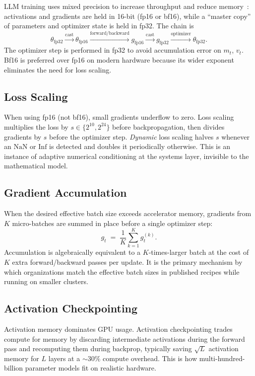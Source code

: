 LLM training uses mixed precision to increase throughput and reduce
memory~\citep{micikevicius2018mixed}: activations and gradients are held
in 16-bit (fp16 or bf16), while a ``master copy'' of parameters and
optimizer state is held in fp32. The chain is
\[
\theta_{\mathrm{fp32}} \xrightarrow{\text{cast}} \theta_{\mathrm{fp16}}
\xrightarrow{\text{forward/backward}} g_{\mathrm{fp16}}
\xrightarrow{\text{cast}} g_{\mathrm{fp32}}
\xrightarrow{\text{optimizer}} \theta_{\mathrm{fp32}}.
\]
The optimizer step is performed in fp32 to avoid accumulation error on
$m_t$, $v_t$. Bf16 is preferred over fp16 on modern hardware because its
wider exponent eliminates the need for loss scaling.

\subsection{Loss Scaling}

When using fp16 (not bf16), small gradients underflow to zero. Loss
scaling multiplies the loss by $s \in \{2^{10}, 2^{24}\}$ before
backpropagation, then divides gradients by $s$ before the optimizer
step. \emph{Dynamic} loss scaling halves $s$ whenever an $\mathrm{NaN}$
or $\mathrm{Inf}$ is detected and doubles it periodically otherwise.
This is an instance of adaptive numerical conditioning at the systems
layer, invisible to the mathematical model.

\subsection{Gradient Accumulation}

When the desired effective batch size exceeds accelerator memory,
gradients from $K$ micro-batches are summed in place before a single
optimizer step:
\[
g_t \;=\; \frac{1}{K}\sum_{k=1}^{K} g_t^{(k)}.
\]
Accumulation is algebraically equivalent to a $K$-times-larger batch at
the cost of $K$ extra forward/backward passes per update. It is the
primary mechanism by which organizations match the effective batch
sizes in published recipes while running on smaller clusters.

\subsection{Activation Checkpointing}

Activation memory dominates GPU usage. Activation checkpointing
\citep{chen2016training} trades compute for memory by discarding
intermediate activations during the forward pass and recomputing them
during backprop, typically saving $\sqrt{L}$ activation memory for $L$
layers at a $\sim 30\%$ compute overhead. This is how multi-hundred-billion
parameter models fit on realistic hardware.

